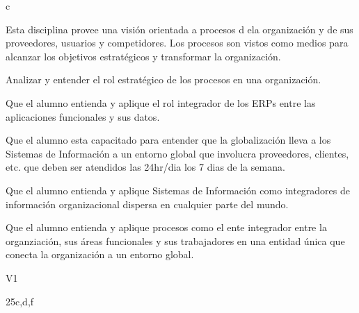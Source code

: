 c\begin{syllabus}


\begin{justification}
	Esta disciplina provee una visión orientada a procesos d ela organización y de sus proveedores, usuarios y competidores. Los procesos son vistos como medios para alcanzar los objetivos estratégicos y transformar la organización.
	\end{justification}
	
	\begin{goals}
	\item Analizar y entender el rol estratégico de los procesos en una organización.
	\item Que el alumno entienda y aplique el rol integrador de los ERPs entre las aplicaciones funcionales y sus datos.
	\item Que el alumno esta capacitado para entender que la globalización lleva a los Sistemas de Información a un entorno global que involucra proveedores, clientes, etc. que deben ser atendidos las 24hr/dia los 7 dias de la semana.
	\item Que el alumno entienda y aplique Sistemas de Información como integradores de información organizacional dispersa en cualquier parte del mundo.
	\item Que el alumno entienda y aplique procesos como el ente integrador entre la organziación, sus áreas funcionales y sus trabajadores en una entidad única que conecta la organización a un entorno global.
	\end{goals}
	
	\begin{outcomes}{V1}
		\item {}
		\item {}
		\item {}
		\item {}
		\item {}
	\end{outcomes}
	
	\begin{unit}{\LUTWOONEDef}{}{\LUTWOONEBib}{25}{c,d,f}
	   \begin{topics}
		   \item \OMCONETopicTWOxONExEIGHT
			\begin{subtopics}
				\item \OMCONETopicTWOxONExEIGHTxONE
				\item \OMCONETopicTWOxONExEIGHTxTWO
				\item \OMCONETopicTWOxONExEIGHTxTHREE
				\item \OMCONETopicTWOxONExEIGHTxFOUR
			\end{subtopics}
	   \end{topics}
		\LUTWOONEGoal
	\end{unit}
	

\end{syllabus}
